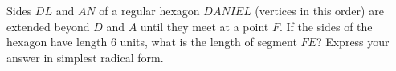 Sides $DL$ and $AN$ of a regular hexagon $DANIEL$ (vertices in this order) are extended beyond $D$ and $A$ until they meet at a point $F$. If the sides of the hexagon have length $6$ units, what is the length of segment $FE$? Express your answer in simplest radical form.
